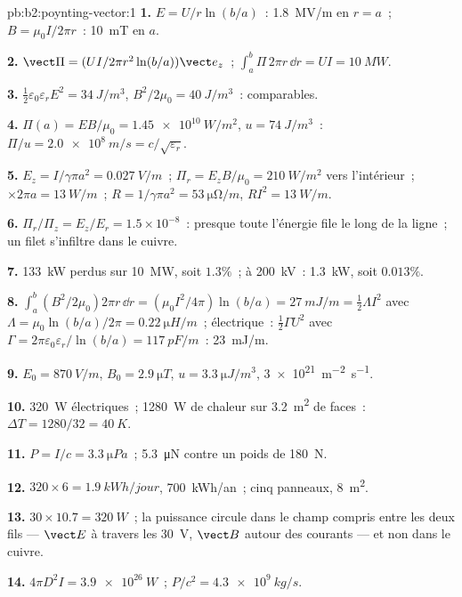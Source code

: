 \begin{solution}{pb:b2:poynting-vector:1}
\textbf{1.} $E = U/r\ln(b/a)$~: \qty{1.8}{MV/m} en $r = a$~; $B = \mu_0I/2\pi r$~:
\qty{10}{mT} en $a$.

\textbf{2.} $\vect\Pi = (UI/2\pi r^2\ln(b/a))\vect e_z$~; $\int_a^b\Pi\,2\pi r\,\dd r = UI =
\qty{10}{MW}$.

\textbf{3.} $\tfrac12\varepsilon_0\varepsilon_rE^2 = \qty{34}{J/m^3}$, $B^2/2\mu_0 = \qty{40}{J/m^3}$~:
comparables.

\textbf{4.} $\Pi(a) = EB/\mu_0 = \qty{1.45e10}{W/m^2}$, $u = \qty{74}{J/m^3}$~: $\Pi/u =
\qty{2.0e8}{m/s} = c/\sqrt{\varepsilon_r}$.

\textbf{5.} $E_z = I/\gamma\pi a^2 = \qty{0.027}{V/m}$~; $\Pi_r = E_zB/\mu_0 = \qty{210}{W/m^2}$
vers l'intérieur~; $\times2\pi a = \qty{13}{W/m}$~; $R = 1/\gamma\pi a^2 = \qty{53}{\micro\ohm/m}$, $RI^2 =
\qty{13}{W/m}$.

\textbf{6.} $\Pi_r/\Pi_z = E_z/E_r = 1.5 \times 10^{-8}$~: presque toute l'énergie file
le long de la ligne~; un filet s'infiltre dans le cuivre.

\textbf{7.} \qty{133}{kW} perdus sur \qty{10}{MW}, soit $1.3\%$~; à \qty{200}{kV}~: \qty{1.3}{kW},
soit $0.013\%$.

\textbf{8.} $\int_a^b(B^2/2\mu_0)2\pi r\,\dd r = (\mu_0I^2/4\pi)\ln(b/a) = \qty{27}{mJ/m} =
\tfrac12\Lambda I^2$ avec $\Lambda = \mu_0\ln(b/a)/2\pi = \qty{0.22}{\micro H/m}$~; électrique~:
$\tfrac12\Gamma U^2$ avec $\Gamma = 2\pi\varepsilon_0\varepsilon_r/\ln(b/a) = \qty{117}{pF/m}$~: \qty{23}{mJ/m}.

\textbf{9.} $E_0 = \qty{870}{V/m}$, $B_0 = \qty{2.9}{\micro T}$, $u = \qty{3.3}{\micro J/m^3}$,
\qty{3e21}{m^{-2}.s^{-1}}.

\textbf{10.} \qty{320}{W} électriques~; \qty{1280}{W} de chaleur sur \qty{3.2}{m^2} de
faces~: $\Delta T = 1280/32 = \qty{40}{K}$.

\textbf{11.} $P = I/c = \qty{3.3}{\micro Pa}$~; \qty{5.3}{\micro N} contre un poids de
\qty{180}{N}.

\textbf{12.} $320 \times 6 = \qty{1.9}{kWh/jour}$, \qty{700}{kWh/an}~; cinq panneaux,
\qty{8}{m^2}.

\textbf{13.} $30 \times 10.7 = \qty{320}{W}$~; la puissance circule dans le champ compris entre
les deux fils --- $\vect E$ à travers les \qty{30}{V}, $\vect B$ autour des courants ---
et non dans le cuivre.

\textbf{14.} $4\pi D^2I = \qty{3.9e26}{W}$~; $P/c^2 = \qty{4.3e9}{kg/s}$.


\end{solution}
